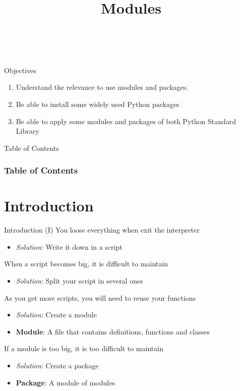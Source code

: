 \documentclass[10pt,compress]{beamer} %
\title[Modules]{Modules}
\author{\asignatura\\\carrera}
\institute{}
\date{}
\begin{document}
{\titlepageBlue
    \begin{frame}
        \titlepage
    \end{frame}
}

\institute{\asignatura}

\begin{frame}[plain]{}
	\begin{block}{Objectives}
		\begin{enumerate}
		\item Understand the relevance to use modules and packages.
		\item Be able to install some widely used Python packages%
		\item Be able to apply some modules and packages of both Python Standard Library%
		\end{enumerate}
	\end{block}
\end{frame}

{
\begin{frame}[shrink]{Table of Contents}
 \frametitle{Table of Contents}
 \tableofcontents
\end{frame}
}

\section{Introduction}
\begin{frame}{Introduction (I)}
		You loose everything when exit the interpreter
			\begin{itemize}
			\item \textit{Solution}: Write it down in a script
			\end{itemize}
		When a script becomes big, it is difficult to maintain
			\begin{itemize}
			\item \textit{Solution}: Split your script in several ones
			\end{itemize}
		As you get more scripts, you will need to reuse your functions
			\begin{itemize}
			\item \textit{Solution}: Create a \alert{module}
			\item \textbf{Module}: A file that contains definitions, functions and classes
			\end{itemize}
		If a module is too big, it is too difficult to maintain
			\begin{itemize}
			\item \textit{Solution}: Create a \alert{package}
			\item \textbf{Package}: A module of modules
			\end{itemize}
\end{frame}
\end{document}
